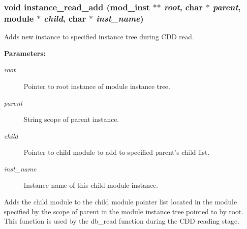 \subsubsection{\setlength{\rightskip}{0pt plus 5cm}void instance\_\-read\_\-add ({\bf mod\_\-inst} $\ast$$\ast$ {\em root}, char $\ast$ {\em parent}, {\bf module} $\ast$ {\em child}, char $\ast$ {\em inst\_\-name})}\label{instance_8h_a4}


Adds new instance to specified instance tree during CDD read.

\begin{Desc}
\item[{\bf Parameters: }]\par
\begin{description}
\item[
{\em root}]Pointer to root instance of module instance tree. \item[
{\em parent}]String scope of parent instance. \item[
{\em child}]Pointer to child module to add to specified parent's child list. \item[
{\em inst\_\-name}]Instance name of this child module instance.

\end{description}
\end{Desc}
Adds the child module to the child module pointer list located in the module specified by the scope of parent in the module instance tree pointed to by root. This function is used by the db\_\-read function during the CDD reading stage. 